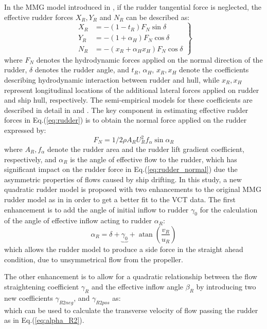 \noindent In the MMG model introduced in \citet{yasukawaIntroductionMMGStandard2015}, if the rudder tangential force is neglected, the effective rudder forces $X_R, Y_R$ and $N_R$ can be described as:
\begin{equation}
   \label{eq:rudder}
  \left.\begin{aligned}
  X_R & = - (1-t_R) F_N \sin \delta\\
  Y_R & = - (1+ \alpha_H) F_N \cos \delta\\
  N_R & = - (x_R + \alpha_H x_H) F_N \cos \delta
\end{aligned}\right\}
\end{equation}
where $F_N$ denotes the hydrodynamic forces applied on the normal direction of the rudder, $\delta$ denotes the rudder angle, and $t_R$, $\alpha_H$, $x_R, x_H$ denote the coefficients describing hydrodynamic interaction between rudder and hull, while $x_R, x_H$ represent longitudinal locations of the additional lateral forces applied on rudder and ship hull, respectively. The semi-empirical models for these coefficients are described in detail in \citet{yasukawaIntroductionMMGStandard2015} and \citet{alexanderssonSystemIdentificationPhysicsinformed2024b}. The key component in estimating effective rudder forces in Eq.(\ref{eq:rudder}) is to obtain the normal force applied on the rudder expressed by:
\begin{equation}
    \label{eq:rudder_normal}
    F_N = 1/2 \rho A_R U_R^{2} f_{\alpha} \sin \alpha_R
\end{equation}
where $A_R, f_\alpha$ denote the rudder area and the rudder lift gradient coefficient, respectively, and $\alpha_R$ is the angle of effective flow to the rudder, which has significant impact on the rudder force in Eq.(\ref{eq:rudder_normal}) due the asymmetric properties of flows caused by ship drifting.
In this study, a new quadratic rudder model is proposed with two enhancements to the original MMG rudder model as in \citet{yasukawaIntroductionMMGStandard2015}  in order to get a better fit to the VCT data. The first enhancement is to add the angle of initial inflow to rudder  $\gamma_0$ for the calculation of the angle of effective inflow acting to rudder $\alpha_R$:  
\begin{equation}
    \label{eq:alpha_R2}
    \alpha_{R} = \delta + \underbrace{\gamma_{0}}_{~} + \operatorname{atan}{\left(\frac{v_{R}}{u_{R}} \right)}
\end{equation}
which allows the rudder model to produce a side force in the straight ahead condition, due to unsymmetrical flow from the propeller.

The other enhancement is to allow for a quadratic relationship between the flow straightening coefficient $\gamma_R$ and the effective inflow angle $\beta_R$ by introducing two new coefficients $\gamma_{R2neg}$, and $\gamma_{R2pos}$ as:  
\begin{equation}
    \label{eq:gamma_R2}
    
\end{equation}
which can be used to calculate the transverse velocity of flow passing the rudder as in Eq.(\ref{eq:alpha_R2}). 
